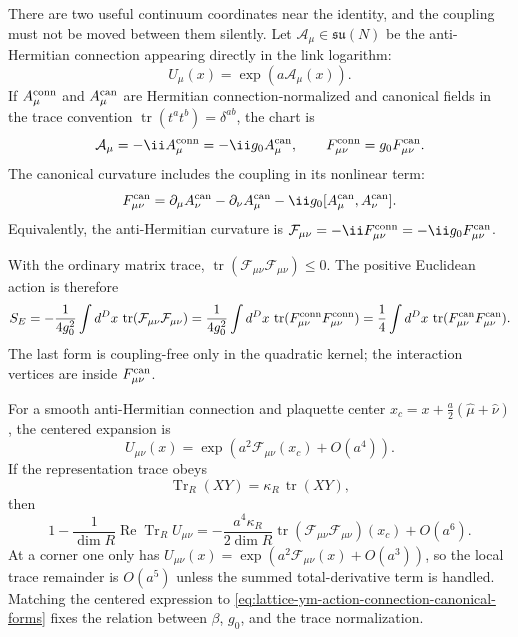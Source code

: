 There are two useful continuum coordinates near the identity, and the coupling
must not be moved between them silently.  Let
\(\mathcal A_\mu\in\mathfrak{su}(N)\) be the anti-Hermitian connection
appearing directly in the link logarithm:
\[
  U_\mu(x)=\exp(a\mathcal A_\mu(x)).
\]
If \(A_\mu^{\rm conn}\) and \(A_\mu^{\rm can}\) are Hermitian
connection-normalized and canonical fields in the trace convention
\(\operatorname{tr}(t^at^b)=\delta^{ab}\), the chart is
\begin{equation}
  \mathcal A_\mu=-\ii A_\mu^{\rm conn}
  =-\ii g_0 A_\mu^{\rm can},
  \qquad
  F_{\mu\nu}^{\rm conn}=g_0F_{\mu\nu}^{\rm can}.
  \label{eq:lattice-connection-canonical-chart}
\end{equation}
The canonical curvature includes the coupling in its nonlinear term:
\[
  F_{\mu\nu}^{\rm can}
  =
  \partial_\mu A_\nu^{\rm can}-\partial_\nu A_\mu^{\rm can}
  -\ii g_0[A_\mu^{\rm can},A_\nu^{\rm can}].
\]
Equivalently, the anti-Hermitian curvature is
\(\mathcal F_{\mu\nu}=-\ii F_{\mu\nu}^{\rm conn}
=-\ii g_0F_{\mu\nu}^{\rm can}\).

With the ordinary matrix trace, \(\operatorname{tr}(\mathcal F_{\mu\nu}
\mathcal F_{\mu\nu})\le0\).  The positive Euclidean action is therefore
\begin{equation}
  S_E
  =
  -\frac{1}{4g_0^2}\int d^Dx\,
  \operatorname{tr}(\mathcal F_{\mu\nu}\mathcal F_{\mu\nu})
  =
  \frac{1}{4g_0^2}\int d^Dx\,
  \operatorname{tr}(F_{\mu\nu}^{\rm conn}F_{\mu\nu}^{\rm conn})
  =
  \frac14\int d^Dx\,
  \operatorname{tr}(F_{\mu\nu}^{\rm can}F_{\mu\nu}^{\rm can}).
  \label{eq:lattice-ym-action-connection-canonical-forms}
\end{equation}
The last form is coupling-free only in the quadratic kernel; the interaction
vertices are inside \(F_{\mu\nu}^{\rm can}\).

For a smooth anti-Hermitian connection and plaquette center
\(x_c=x+\frac a2(\widehat\mu+\widehat\nu)\), the centered expansion is
\[
  U_{\mu\nu}(x)
  =
  \exp\!\left(a^2\mathcal F_{\mu\nu}(x_c)+O(a^4)\right).
\]
If the representation trace obeys
\[
  \operatorname{Tr}_R(XY)=\kappa_R\,\operatorname{tr}(XY),
\]
then
\[
  1-\frac{1}{\dim R}\operatorname{Re}\operatorname{Tr}_R U_{\mu\nu}
  =
  -\frac{a^4\kappa_R}{2\dim R}
  \operatorname{tr}(\mathcal F_{\mu\nu}\mathcal F_{\mu\nu})(x_c)
  +O(a^6).
\]
At a corner one only has
\(U_{\mu\nu}(x)=\exp(a^2\mathcal F_{\mu\nu}(x)+O(a^3))\), so the local trace
remainder is \(O(a^5)\) unless the summed total-derivative term is handled.
Matching the centered expression to
\eqref{eq:lattice-ym-action-connection-canonical-forms} fixes the relation
between \(\beta\), \(g_0\), and the trace normalization.


